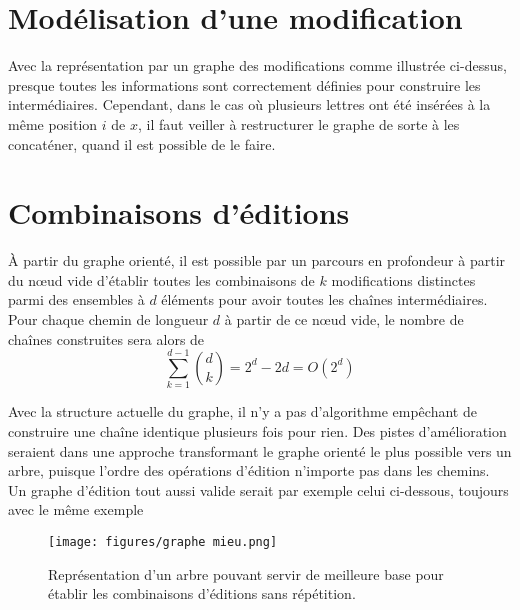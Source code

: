 \documentclass[12pt, twoside]{report}
\begin{document}
\section{Modélisation d'une modification}

Avec la représentation par un graphe des modifications comme illustrée ci-dessus, presque toutes les informations sont correctement définies pour construire les intermédiaires. Cependant, dans le cas où plusieurs lettres ont été insérées à la même position $i$ de $x$, il faut veiller à restructurer le graphe de sorte à les concaténer, quand il est possible de le faire.

\section{Combinaisons d'éditions}

À partir du graphe orienté, il est possible par un parcours en profondeur à partir du n\oe{}ud vide d'établir toutes les combinaisons de $k$ modifications distinctes parmi des ensembles à $d$ éléments pour avoir toutes les chaînes intermédiaires. Pour chaque chemin de longueur $d$ à partir de ce n\oe{}ud vide, le nombre de chaînes construites sera alors de
\begin{equation}
    \sum_{k=1}^{d-1} {{d}\choose{k}} = 2^d - 2d = O(2^d)
\end{equation}

Avec la structure actuelle du graphe, il n'y a pas d'algorithme empêchant de construire une chaîne identique plusieurs fois pour rien. Des pistes d'amélioration seraient dans une approche transformant le graphe orienté le plus possible vers un arbre, puisque l'ordre des opérations d'édition n'importe pas dans les chemins. Un graphe d'édition tout aussi valide serait par exemple celui ci-dessous, toujours avec le même exemple

\begin{figure}[!h]
    \centering
    \texttt{[image: figures/graphe mieu.png]}
    \caption{Représentation d'un arbre pouvant servir de meilleure base pour établir les combinaisons d'éditions sans répétition.}
\end{figure}
\end{document}
